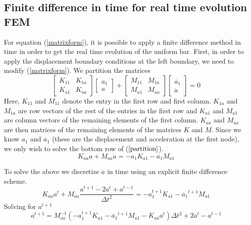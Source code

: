 \documentclass{article}
\begin{document}
\subsection{Finite difference in time for real time evolution FEM} 
\label{femrte}
For equation (\ref{matrixform}), it is possible to apply a finite difference 
method in time in order to get the real time evolution of the uniform bar. 
First, in order to apply the displacement boundary conditions at the left 
boundary, we need to modify (\ref{matrixform}). We partition the matrices 
\begin{equation} \label{partition}
\begin{bmatrix}
K_{11} & K_{1a} \\
K_{a1} & K_{aa}
\end{bmatrix}
\begin{bmatrix}
a_1 \\
a
\end{bmatrix}
+
\begin{bmatrix}
M_{11} & M_{1a} \\
M_{a1} & M_{aa}
\end{bmatrix}
\begin{bmatrix}
\ddot{a_1} \\
\ddot{a}
\end{bmatrix}
= 0
\end{equation}
Here, $K_{11}$ and $M_{11}$ denote the entry in the first row and first column. 
$K_{1a}$ and $M_{1a}$ are row vectors of the rest of the entries in the first 
row and $K_{a1}$ and $M_{a1}$ are column vectors of the remaining elements of 
the first column. $K_{aa}$ and $M_{aa}$ are then matrices of the remaining 
elements of the matrices $K$ and $M$. Since we know $a_1$ and $\ddot{a_1}$ 
(these are the displacement and acceleration at the first node), we only wish 
to solve the bottom row of ($\ref{partition}$).
\begin{equation}
K_{aa}a + M_{aa}\ddot{a} = -a_1K_{a1} - \ddot{a_1}M_{a1}
\end{equation}

To solve the above we discretize $\ddot{a}$ in time using an explicit finite 
difference scheme.
\begin{equation}
K_{aa}a^t + M_{aa}\frac{a^{t+1} - 2a^t + a^{t-1}}{\Delta t^2 } = 
-a_1^{t+1}K_{a1} - \ddot{a_1}^{t+1}M_{a1}
\end{equation}
Solving for $a^{t+1}$
\begin{equation}
a^{t+1} = M_{aa}^{-1}(-a_1^{t+1}K_{a1} - \ddot{a_1}^{t+1}M_{a1} - 
K_{aa}a^t)\Delta t^2 
+ 2a^t - a^{t-1}
\end{equation}

{}

\end{document}

